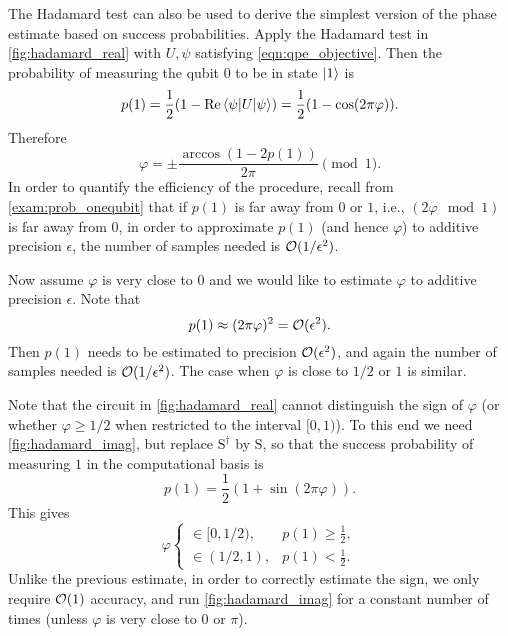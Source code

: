 \begin{exam}\label{exam:singlequbit_pe}
The Hadamard test can also be used to derive the simplest version of the phase estimate based on success probabilities.
Apply the Hadamard test in \cref{fig:hadamard_real} with $U,\psi$ satisfying \cref{eqn:qpe_objective}. Then the probability of measuring the qubit $0$ to be in state $\ket{1}$ is 
\begin{equation}
p(1)=\frac{1}{2}(1-\operatorname{Re} \braket{\psi|U|\psi})=\frac{1}{2}(1-\cos (2\pi\varphi)).
\end{equation}
Therefore
\begin{equation}
\varphi=\pm\frac{\arccos(1-2p(1))}{2\pi} \pmod{1}.
\end{equation}
In order to quantify the efficiency of the procedure, recall from \cref{exam:prob_onequbit} that if $p(1)$ is far away from  $0$ or $1$, i.e., $(2\varphi \mod 1)$ is far away from $0$, in order to approximate $p(1)$ (and hence $\varphi$) to additive precision $\epsilon$, the number of samples needed is $\mathcal{O}(1/\epsilon^2)$.

Now assume $\varphi$ is very close to $0$ and we would like to estimate $\varphi$ to additive precision $\epsilon$. Note that
\begin{equation}
p(1)\approx (2\pi\varphi)^2 = \mathcal{O}(\epsilon^2).
\end{equation}
Then $p(1)$ needs to be estimated to precision $\mathcal{O}(\epsilon^2)$, and again the number of samples needed is $\mathcal{O}(1/\epsilon^2)$. The case when $\varphi$ is close to $1/2$ or $1$ is similar.

Note that the circuit in \cref{fig:hadamard_real} cannot distinguish the sign of $\varphi$ (or  whether $\varphi\ge 1/2$ when restricted to the interval $[0,1)$).
To this end we need \cref{fig:hadamard_imag}, but replace $\mathrm{S}^{\dag}$ by $\mathrm{S}$, so that the success probability of measuring $1$ in the computational basis is
\begin{equation} 
p(1)=\frac{1}{2}(1+\sin(2\pi\varphi)).
\end{equation}
This gives
\begin{equation}
 \varphi
\begin{cases}
\in[0,1/2), & p(1)\ge \frac12,\\
\in(1/2,1),    & p(1)< \frac12.
\end{cases}
\end{equation}
Unlike the previous estimate, in order to correctly estimate the sign, we only require $\mathcal{O}(1)$ accuracy, and run \cref{fig:hadamard_imag} for a constant number of times (unless $\varphi$ is very close to $0$ or $\pi$).
\end{exam}

